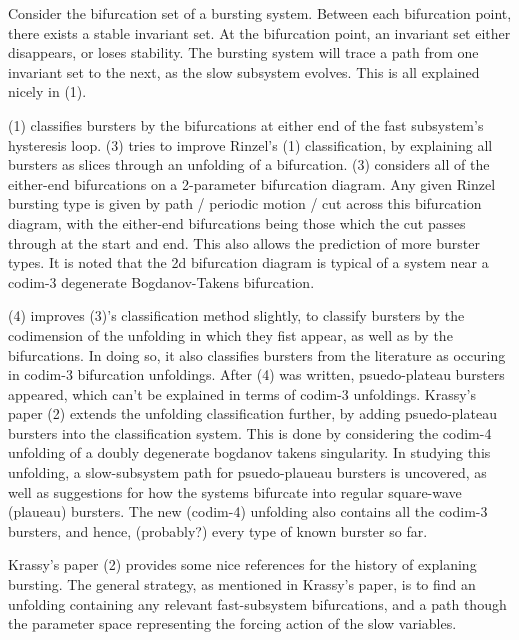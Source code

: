 \documentclass[11pt]{article}
\begin{document}
Consider the bifurcation set of a bursting system.
Between each bifurcation point, there exists a stable invariant set.
At the bifurcation point, an invariant set either disappears, or loses stability.
The bursting system will trace a path from one invariant set to the next, as the slow subsystem evolves.
This is all explained nicely in (1).

(1) classifies bursters by the bifurcations at either end of the fast subsystem's hysteresis loop.
(3) tries to improve Rinzel's (1) classification, by explaining all bursters as slices through an unfolding of a bifurcation.
(3) considers all of the either-end bifurcations on a 2-parameter bifurcation diagram.
Any given Rinzel bursting type is given by path / periodic motion / cut across this bifurcation diagram, with the either-end bifurcations being those which the cut passes through at the start and end. 
This also allows the prediction of more burster types.
It is noted that the 2d bifurcation diagram is typical of a system near a codim-3 degenerate Bogdanov-Takens bifurcation.

(4) improves (3)'s classification method slightly, to classify bursters by the codimension of the unfolding in which they fist appear, as well as by the bifurcations.
In doing so, it also classifies bursters from the literature as occuring in codim-3 bifurcation unfoldings.
After (4) was written, psuedo-plateau bursters appeared, which can't be explained in terms of codim-3 unfoldings.
Krassy's paper (2) extends the unfolding classification further, by adding psuedo-plateau bursters into the classification system.
This is done by considering the codim-4 unfolding of a doubly degenerate bogdanov takens singularity.
In studying this unfolding, a slow-subsystem path for psuedo-plaueau bursters is uncovered, as well as suggestions for how the systems bifurcate into regular square-wave (plaueau) bursters.
The new (codim-4) unfolding also contains all the codim-3 bursters, and hence, (probably?) every type of known burster so far.

Krassy's paper (2) provides some nice references for the history of explaning bursting.
The general strategy, as mentioned in Krassy's paper, is to find an unfolding containing any relevant fast-subsystem bifurcations, and a path though the parameter space representing the forcing action of the slow variables.
\end{document}
